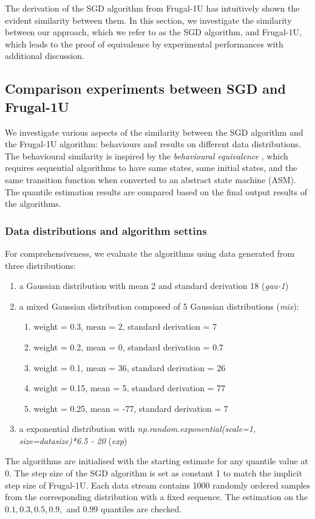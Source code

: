 The derivation of the SGD algorithm from Frugal-1U has intuitively shown the evident similarity between them. In this section, we investigate the similarity between our approach, which we refer to as the SGD algorithm, and Frugal-1U, which leads to the proof of equivalence by experimental performances with additional discussion.

\subsection{Comparison experiments between SGD and Frugal-1U}

We investigate various aspects of the similarity between the SGD algorithm and the Frugal-1U algorithm: behaviours and results on different data distributions. The behavioural similarity is inspired by the \textit{behavioural equivalence} \cite{gurevichSequentialAbstractstateMachines2000}, which requires sequential algorithms to have same states, same initial states, and the same transition function when converted to an abstract state machine (ASM). The quantile estimation results are compared based on the final output results of the algorithms.

\subsubsection{Data distributions and algorithm settins}
\label{subsubsec: distro_and_setting}
For comprehensiveness, we evaluate the algorithms using data generated from three distributions:
    \begin{enumerate}
        \item a Gaussian distribution with mean 2 and standard derivation 18 (\textit{gau-1})
        \item a mixed Gaussian distribution composed of 5 Gaussian distributions (\textit{mix}):
            \begin{enumerate}
                \item weight = 0.3, mean = 2, standard derivation = 7
                \item weight = 0.2, mean = 0, standard derivation = 0.7
                \item weight = 0.1, mean = 36, standard derivation = 26
                \item weight = 0.15, mean = 5, standard derivation = 77
                \item weight = 0.25, mean = -77, standard derivation = 7
            \end{enumerate}
            \item a exponential distribution with \textit{np.random.exponential(scale=1, size=datasize)*6.5 - 20} (\textit{exp})
    \end{enumerate}
The algorithms are initialised with the starting estimate for any quantile value at $0$. The step size of the SGD algorithm is set as constant 1 to match the implicit step size of Frugal-1U. Each data stream contains 1000 randomly ordered samples from the corresponding distribution with a fixed sequence. The estimation on the $0.1, 0.3, 0.5, 0.9,$ and $0.99$ quantiles are checked.

